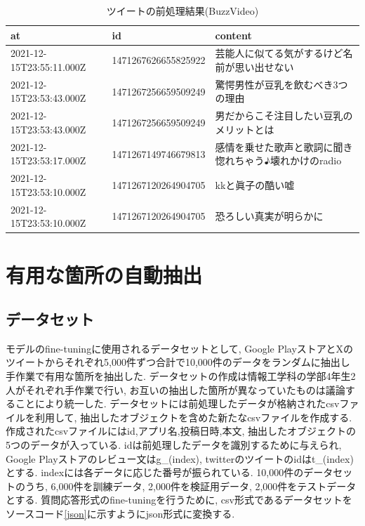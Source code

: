 \begin{table}[htbp]
  \caption{ツイートの前処理結果(BuzzVideo)}
  \label{tb:twittercsv}
  \begin{center}
  \begin{tabularx}{\linewidth}{|l|l|X|}
    \hline
    at&id&content\\\hline\hline
    2021-12-15T23:55:11.000Z&1471267626655825922&芸能人に似てる気がするけど名前が思い出せない\\\hline
    2021-12-15T23:53:43.000Z&1471267256659509249&驚愕男性が豆乳を飲むべき3つの理由\\\hline
    2021-12-15T23:53:43.000Z&1471267256659509249&男だからこそ注目したい豆乳のメリットとは\\\hline
    2021-12-15T23:53:17.000Z&1471267149746679813&感情を乗せた歌声と歌詞に聞き惚れちゃう♪壊れかけのradio\\\hline
    2021-12-15T23:53:10.000Z&1471267120264904705&kkと眞子の酷い嘘\\\hline
    2021-12-15T23:53:10.000Z&1471267120264904705&恐ろしい真実が明らかに\\\hline
  \end{tabularx}\end{center}
\end{table}


\section{有用な箇所の自動抽出}
\subsection{データセット}
モデルのfine-tuningに使用されるデータセットとして, Google PlayストアとXのツイートからそれぞれ5,000件ずつ合計で10,000件のデータをランダムに抽出し手作業で有用な箇所を抽出した. データセットの作成は情報工学科の学部4年生2人がそれぞれ手作業で行い, お互いの抽出した箇所が異なっていたものは議論することにより統一した. 
データセットには前処理したデータが格納されたcsvファイルを利用して, 抽出したオブジェクトを含めた新たなcsvファイルを作成する. 作成されたcsvファイルにはid,アプリ名,投稿日時,本文, 抽出したオブジェクトの5つのデータが入っている. idは前処理したデータを識別するために与えられ, Google Playストアのレビュー文はg\_(index), twitterのツイートのidはt\_(index)とする.  indexには各データに応じた番号が振られている. 
10,000件のデータセットのうち, 6,000件を訓練データ, 2,000件を検証用データ, 2,000件をテストデータとする. 質問応答形式のfine-tuningを行うために, csv形式であるデータセットをソースコード\ref{json}に示すようにjson形式に変換する. 

